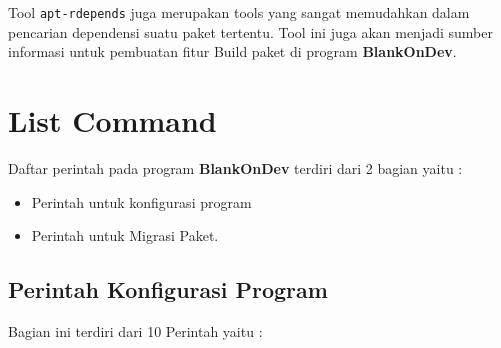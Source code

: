 \noindent
Tool \texttt{apt-rdepends} juga merupakan tools yang sangat memudahkan dalam pencarian dependensi suatu paket tertentu. Tool ini juga akan menjadi sumber informasi untuk pembuatan fitur Build paket di program \textbf{BlankOnDev}.

\section{List Command}
\noindent
Daftar perintah pada program \textbf{BlankOnDev} terdiri dari 2 bagian yaitu :
\begin{itemize}
	\item Perintah untuk konfigurasi program
	\item Perintah untuk Migrasi Paket.
\end{itemize}

\subsection{Perintah Konfigurasi Program}
\noindent
Bagian ini terdiri dari 10 Perintah yaitu :
